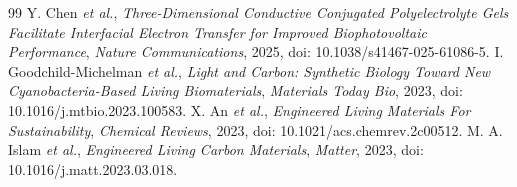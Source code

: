 \documentclass[conference]{IEEEtran}
\begin{document}
\begin{thebibliography}{99}
 Y. Chen \emph{et al.}, \emph{Three-Dimensional Conductive Conjugated Polyelectrolyte Gels Facilitate Interfacial Electron Transfer for Improved Biophotovoltaic Performance}, \emph{Nature Communications}, 2025, doi: 10.1038/s41467-025-61086-5.
 I. Goodchild-Michelman \emph{et al.}, \emph{Light and Carbon: Synthetic Biology Toward New Cyanobacteria-Based Living Biomaterials}, \emph{Materials Today Bio}, 2023, doi: 10.1016/j.mtbio.2023.100583.
 X. An \emph{et al.}, \emph{Engineered Living Materials For Sustainability}, \emph{Chemical Reviews}, 2023, doi: 10.1021/acs.chemrev.2c00512.
 M. A. Islam \emph{et al.}, \emph{Engineered Living Carbon Materials}, \emph{Matter}, 2023, doi: 10.1016/j.matt.2023.03.018.
\end{thebibliography}
\end{document}
